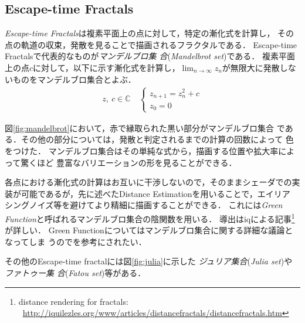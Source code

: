 \subsection{Escape-time Fractals}

\textit{Escape-time Fractals}は複素平面上の点に対して，特定の漸化式を計算し，
その点の軌道の収束，発散を見ることで描画されるフラクタルである．
Escape-time Fractalsで代表的なものが\emph{マンデルブロ集
合}(\textit{Mandelbrot set})である．
複素平面上の点$c$に対して，以下に示す漸化式を計算し，$\displaystyle \lim_{n
\to \infty} z_n$が無限大に発散しないものをマンデルブロ集合とよぶ．
\begin{align*}
 z,~c \in \mathbb{C} \quad
 \begin{cases}
  z_{n+1} = z^2_{n} + c \\ z_0 = 0
 \end{cases}
\end{align*}

図\ref{fig:mandelbrot}において，赤で縁取られた黒い部分がマンデルブロ集合
である．その他の部分については，発散と判定されるまでの計算の回数によって
色をつけた．
マンデルブロ集合はその単純な式から，描画する位置や拡大率によって驚くほど
豊富なバリエーションの形を見ることができる．

各点における漸化式の計算はお互いに干渉しないので，そのままシェーダでの実
装が可能であるが，先に述べたDistance Estimationを用いることで，エイリア
シングノイズ等を避けてより精細に描画することができる．
これには\textit{Green Function}と呼ばれるマンデルブロ集合の陰関数を用いる．
導出はiqによる記事\footnote{distance rendering for fractals:
~\url{http://iquilezles.org/www/articles/distancefractals/distancefractals.htm}}
が詳しい．
Green Functionについてはマンデルブロ集合に関する詳細な議論となってしま
うので\cite{douady1984exploring}を参考にされたい．

その他のEscape-time fractalには図\ref{fig:julia}に示した
\emph{ジュリア集合}(\textit{Julia set})や\emph{ファトゥー集
合}(\textit{Fatou set})等がある．

